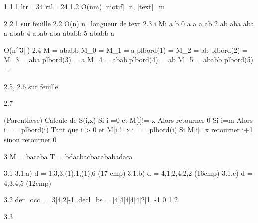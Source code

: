 1
1.1	
	ltr= 34
	rtl= 24
1.2 
	O(nm) |motif|=n, |text|=m

2
2.1
	sur feuille
2.2
	O(n) n=longueur de text
2.3 
	i	Mi 			a 		b
	0	\varepsilon	a 		 	a 			a 		ab
	2 	ab 			aba 	 	aba 		a 		abab
	4 	abab 		aba 	ababb
	5 	ababb 		a 		\varepsilon

	O(n^3|\sigma|)
2.4
	M = ababb
	M_0 = \varepsilon
	M_1 = a  		plbord(1) = \varepsilon
	M_2 = ab 		plbord(2) = \varepsilon
	M_3 = aba 		plbord(3) = a
	M_4 = abab 		plbord(4) = ab
	M_5 = ababb 	plbord(5) = \varepsilon

2.5, 2.6
	sur feuille

2.7
	



(Parenthese)
Calcule de S(i,x)
Si i =0 et M[i]!= x Alors
	retourner 0
Si i=m Alors
	i == plbord(i)
Tant que i > 0 et M[i]!=x
	i == plbord(i)
Si M[i]=x
	retourner i+1
sinon retourner 0



3
M = bacaba
T = bdacbacbacababadaca

3.1
3.1.a) d = {1,3,3,(1),1,(1),6} 	(17 cmp)
3.1.b) d = {4,1,2,4,2,2} (16cmp)
3.1.c) d = {4,3,4,5} (12cmp)

3.2
der_occ = [3|4|2|-1]
decl_bs = [4|4|4|4|4|2|1]
		  -1 0 1 2

3.3
